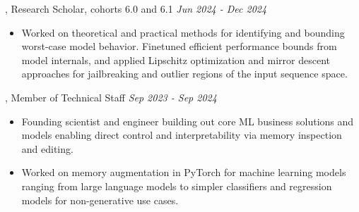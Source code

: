 \documentclass[]{article}
\begin{document}
, Research Scholar, cohorts 6.0 and 6.1 \hfill \textit{Jun 2024 - Dec 2024}
\begin{itemize}[label={$\bullet$}]
	\item Worked on theoretical and practical methods for identifying and bounding worst-case model behavior. Finetuned efficient performance bounds from model internals, and applied Lipschitz optimization and mirror descent approaches for jailbreaking and outlier regions of the input sequence space.
\end{itemize} 

, Member of Technical Staff \hfill \textit{Sep 2023 - Sep 2024}
\begin{itemize}[label={$\bullet$}]
	\item Founding scientist and engineer building out core ML business solutions and models enabling direct control and interpretability via memory inspection and editing.
	\item Worked on memory augmentation in PyTorch for machine learning models ranging from large language models to simpler classifiers and regression models for non-generative use cases.
\end{itemize}

\end{document}
